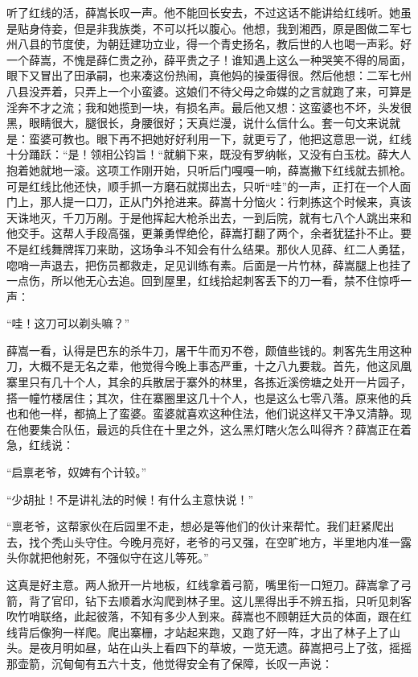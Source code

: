 听了红线的活，薛嵩长叹一声。他不能回长安去，不过这话不能讲给红线听。她虽是贴身侍妾，但是非我族类，不可以托以腹心。他想，我到湘西，原是图做二军七州八县的节度使，为朝廷建功立业，得一个青史扬名，教后世的人也喝一声彩。好一个薛嵩，不愧是薛仁贵之孙，薛平贵之子！谁知遇上这么一种哭笑不得的局面，眼下又冒出了田承嗣，也来凑这份热闹，真他妈的操蛋得很。然后他想：二军七州八县没弄着，只弄上一个小蛮婆。这娘们不待父母之命媒的之言就跑了来，可算是淫奔不才之流；我和她揽到一块，有损名声。最后他又想：这蛮婆也不坏，头发很黑，眼睛很大，腿很长，身腰很好；天真烂漫，说什么信什么。套一句文来说就是：蛮婆可教也。眼下再不把她好好利用一下，就更亏了，他把这意思一说，红线十分踊跃：“是！领相公钧旨！“就躺下来，既没有罗纳帐，又没有白玉枕。薛大人抱着她就地一滚。这项工作刚开始，只听后门嘎嘎一响，薛嵩撇下红线就去抓枪。可是红线比他还快，顺手抓一方磨石就掷出去，只听“哇”的一声，正打在一个人面门上，那人提一口刀，正从门外抢进来。薛嵩十分恼火：行刺拣这个时候来，真该天诛地灭，千刀万剐。于是他挥起大枪杀出去，一到后院，就有七八个人跳出来和他交手。这帮人手段高强，更兼勇悍绝伦，薛嵩打翻了两个，余者犹猛扑不止。要不是红线舞牌挥刀来助，这场争斗不知会有什么结果。那伙人见薛、红二人勇猛，唿哨一声退去，把伤员都救走，足见训练有素。后面是一片竹林，薛嵩腿上也挂了一点伤，所以他无心去追。回到屋里，红线拾起刺客丢下的刀一看，禁不住惊呼一声： 

“哇！这刀可以剃头嘛？” 

薛嵩一看，认得是巴东的杀牛刀，屠干牛而刃不卷，颇值些钱的。刺客先生用这种刀，大概不是无名之辈，他觉得今晚上事态严重，十之八九要栽。首先，他这凤凰寨里只有几十个人，其余的兵散居于寨外的林里，各拣近溪傍塘之处开一片园子，搭一幢竹楼居住；其次，住在寨圈里这几十个人，也是这么七零八落。原来他的兵也和他一样，都搞上了蛮婆。蛮婆就喜欢这种住法，他们说这样又干净又清静。现在他要集合队伍，最远的兵住在十里之外，这么黑灯瞎火怎么叫得齐？薛嵩正在着急，红线说： 

“启禀老爷，奴婢有个计较。” 

“少胡扯！不是讲礼法的时候！有什么主意快说！” 

“禀老爷，这帮家伙在后园里不走，想必是等他们的伙计来帮忙。我们赶紧爬出去，找个秃山头守住。今晚月亮好，老爷的弓又强，在空旷地方，半里地内准一露头你就把他射死，不强似守在这儿等死。” 

这真是好主意。两人掀开一片地板，红线拿着弓箭，嘴里衔一口短刀。薛嵩拿了弓箭，背了官印，钻下去顺着水沟爬到林子里。这儿黑得出手不辨五指，只听见刺客吹竹哨联络，此起彼落，不知有多少人到来。薛嵩也不顾朝廷大员的体面，跟在红线背后像狗一样爬。爬出寨栅，才站起来跑，又跑了好一阵，才出了林子上了山头。是夜月明如昼，站在山头上看四下的草坡，一览无遗。薛嵩把弓上了弦，摇摇那壶箭，沉甸甸有五六十支，他觉得安全有了保障，长叹一声说： 

